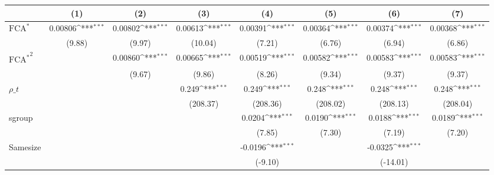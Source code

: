 {
\def\sym#1{\ifmmode^{#1}\else\(^{#1}\)\fi}
\begin{tabular}{l*{7}{c}}
\hline\hline
                    &\multicolumn{1}{c}{(1)}         &\multicolumn{1}{c}{(2)}         &\multicolumn{1}{c}{(3)}         &\multicolumn{1}{c}{(4)}         &\multicolumn{1}{c}{(5)}         &\multicolumn{1}{c}{(6)}         &\multicolumn{1}{c}{(7)}         \\
\hline
$ \text{FCA}^* $    &     0.00806\sym{***}&     0.00802\sym{***}&     0.00613\sym{***}&     0.00391\sym{***}&     0.00364\sym{***}&     0.00374\sym{***}&     0.00368\sym{***}\\
                    &      (9.88)         &      (9.97)         &     (10.04)         &      (7.21)         &      (6.76)         &      (6.94)         &      (6.86)         \\
[1em]
 $ { \text{FCA} ^ * } ^2 $&                     &     0.00860\sym{***}&     0.00665\sym{***}&     0.00519\sym{***}&     0.00582\sym{***}&     0.00583\sym{***}&     0.00583\sym{***}\\
                    &                     &      (9.67)         &      (9.86)         &      (8.26)         &      (9.34)         &      (9.37)         &      (9.37)         \\
[1em]
$ \rho\_t $          &                     &                     &       0.249\sym{***}&       0.249\sym{***}&       0.248\sym{***}&       0.248\sym{***}&       0.248\sym{***}\\
                    &                     &                     &    (208.37)         &    (208.36)         &    (208.02)         &    (208.13)         &    (208.04)         \\
[1em]
sgroup              &                     &                     &                     &      0.0204\sym{***}&      0.0190\sym{***}&      0.0188\sym{***}&      0.0189\sym{***}\\
                    &                     &                     &                     &      (7.85)         &      (7.30)         &      (7.19)         &      (7.20)         \\
[1em]
Samesize            &                     &                     &                     &     -0.0196\sym{***}&                     &     -0.0325\sym{***}&                     \\
                    &                     &                     &                     &     (-9.10)         &                     &    (-14.01)         &                     \\

\end{tabular}}
